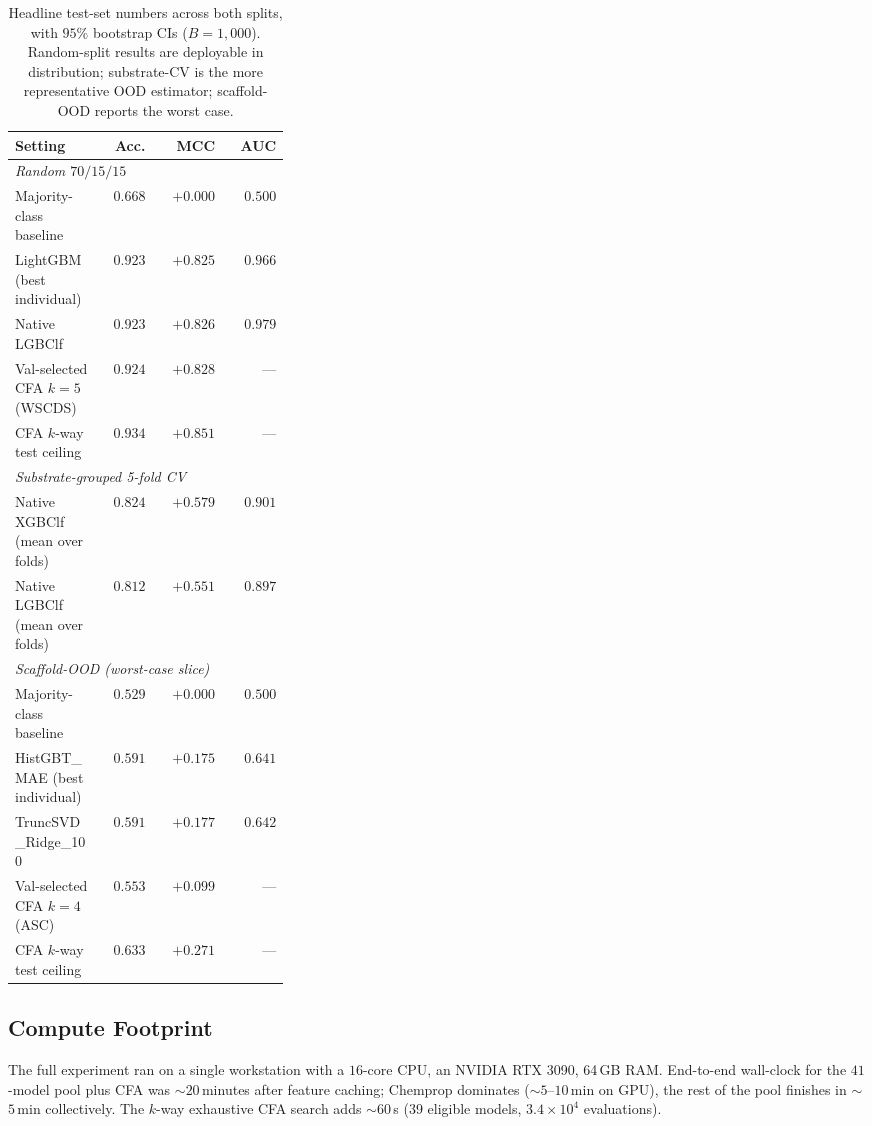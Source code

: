 \documentclass[conference]{IEEEtran}
\begin{document}
\begin{table}[t]
\centering
\small
\caption{Headline test-set numbers across both splits, with $95\%$
bootstrap CIs ($B\!=\!1{,}000$). Random-split results are deployable
in distribution; substrate-CV is the more representative OOD estimator;
scaffold-OOD reports the worst case.}
\label{tab:headline}
\begin{tabular}{p{0.32\linewidth}rrr}
\toprule
\textbf{Setting} & \textbf{Acc.} & \textbf{MCC} & \textbf{AUC} \\
\midrule
\multicolumn{4}{l}{\emph{Random $70/15/15$}} \\
Majority-class baseline                  & $0.668$ & $+0.000$ & $0.500$ \\
LightGBM (best individual)               & $0.923$ & $+0.825$ & $0.966$ \\
Native LGBClf                            & $0.923$ & $+0.826$ & $0.979$ \\
Val-selected CFA $k\!=\!5$ (\textsc{WSCDS}) & $0.924$ & $+0.828$ & --- \\
CFA $k$-way test ceiling                 & $0.934$ & $+0.851$ & --- \\
\midrule
\multicolumn{4}{l}{\emph{Substrate-grouped 5-fold CV}} \\
Native XGBClf (mean over folds)          & $0.824$ & $+0.579$ & $0.901$ \\
Native LGBClf (mean over folds)          & $0.812$ & $+0.551$ & $0.897$ \\
\midrule
\multicolumn{4}{l}{\emph{Scaffold-OOD (worst-case slice)}} \\
Majority-class baseline                  & $0.529$ & $+0.000$ & $0.500$ \\
HistGBT\_MAE (best individual)           & $0.591$ & $+0.175$ & $0.641$ \\
TruncSVD\_Ridge\_100                     & $0.591$ & $+0.177$ & $0.642$ \\
Val-selected CFA $k\!=\!4$ (\textsc{ASC}) & $0.553$ & $+0.099$ & --- \\
CFA $k$-way test ceiling                 & $0.633$ & $+0.271$ & --- \\
\bottomrule
\end{tabular}
\end{table}

\subsection{Compute Footprint}
The full experiment ran on a single workstation with a $16$-core CPU, an
NVIDIA RTX 3090, 64\,GB RAM. End-to-end wall-clock for the
$41$-model pool plus CFA was $\sim$$20$\,minutes after feature caching;
Chemprop dominates ($\sim$$5$--$10$\,min on GPU), the rest of the pool
finishes in $\sim$$5$\,min collectively. The $k$-way exhaustive CFA
search adds $\sim$$60$\,s (39 eligible models, $3.4\!\times\!10^{4}$
evaluations).
\end{document}
